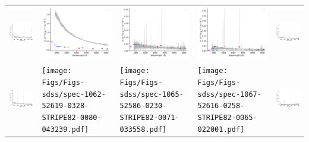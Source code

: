 \begin{center}
\begin{longtable}{l l l l l }
    \includegraphics[width=0.19\linewidth, clip]{Figs/Figs-sdss/spec-0984-52442-0311-STRIPE82-0105-069446.pdf} & \includegraphics[width=0.19\linewidth, clip]{Figs/Figs-sdss/spec-0984-52442-0533-STRIPE82-0108-039253.pdf} & \includegraphics[width=0.19\linewidth, clip]{Figs/Figs-sdss/spec-0990-52465-0605-STRIPE82-0124-071122.pdf} & \includegraphics[width=0.19\linewidth, clip]{Figs/Figs-sdss/spec-1023-52818-0521-STRIPE82-0106-057954.pdf} & \includegraphics[width=0.19\linewidth, clip]{Figs/Figs-sdss/spec-1024-52826-0028-STRIPE82-0109-049060.pdf} \\
    \includegraphics[width=0.19\linewidth, clip]{Figs/Figs-sdss/spec-1033-52822-0623-STRIPE82-0134-016856.pdf} & \texttt{[image: Figs/Figs-sdss/spec-1062-52619-0328-STRIPE82-0080-043239.pdf]} & \texttt{[image: Figs/Figs-sdss/spec-1065-52586-0230-STRIPE82-0071-033558.pdf]} & \texttt{[image: Figs/Figs-sdss/spec-1067-52616-0258-STRIPE82-0065-022001.pdf]} & \includegraphics[width=0.19\linewidth, clip]{Figs/Figs-sdss/spec-1068-52614-0292-STRIPE82-0061-011616.pdf} \\

\end{longtable}
\end{center}
